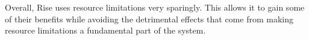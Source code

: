     Overall, Rise uses resource limitations very sparingly.
    This allows it to gain some of their benefits while avoiding the detrimental effects that come from making resource limitations a fundamental part of the system.





